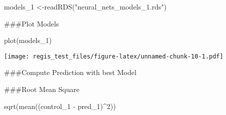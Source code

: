 \documentclass[
]{article}
\newenvironment{Shaded}{\begin{snugshade}}{\end{snugshade}}
\newcommand{\DecValTok}[1]{\textcolor[rgb]{0.00,0.00,0.81}{#1}}
\newcommand{\FunctionTok}[1]{\textcolor[rgb]{0.00,0.00,0.00}{#1}}
\newcommand{\NormalTok}[1]{#1}
\newcommand{\OtherTok}[1]{\textcolor[rgb]{0.56,0.35,0.01}{#1}}
\newcommand{\SpecialCharTok}[1]{\textcolor[rgb]{0.00,0.00,0.00}{#1}}
\newcommand{\StringTok}[1]{\textcolor[rgb]{0.31,0.60,0.02}{#1}}
\begin{document}
\begin{Shaded}
\begin{Highlighting}[]
\NormalTok{models\_1 }\OtherTok{\textless{}{-}}\FunctionTok{readRDS}\NormalTok{(}\StringTok{"neural\_nets\_models\_1.rds"}\NormalTok{)}
\end{Highlighting}
\end{Shaded}

\#\#\#Plot Models

\begin{Shaded}
\begin{Highlighting}[]
\FunctionTok{plot}\NormalTok{(models\_1)}
\end{Highlighting}
\end{Shaded}

\texttt{[image: regis\_test\_files/figure-latex/unnamed-chunk-10-1.pdf]}

\#\#\#Compute Prediction with best Model

\begin{Shaded}
\end{Shaded}

\#\#\#Root Mean Square

\begin{Shaded}
\begin{Highlighting}[]
\FunctionTok{sqrt}\NormalTok{(}\FunctionTok{mean}\NormalTok{((control\_1 }\SpecialCharTok{{-}}\NormalTok{ pred\_1)}\SpecialCharTok{\^{}}\DecValTok{2}\NormalTok{))}
\end{Highlighting}
\end{Shaded}
\end{document}
